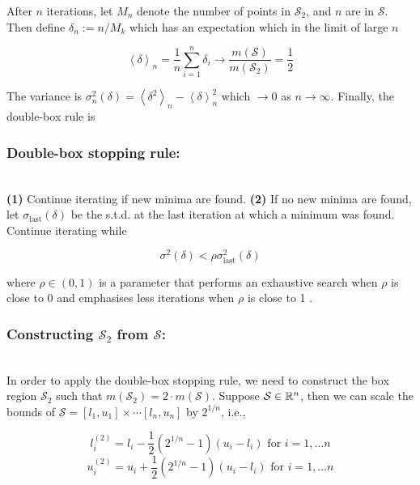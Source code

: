 After $n$ iterations, let $M_n$ denote the number of points in $\mathcal{S}_2$, and $n$ are in $\mathcal{S}$. Then define
$\delta_n := n / M_k$ which has an expectation which in the limit of large $n$

$$
\left\langle \delta \right\rangle_n = \frac{1}{n}\sum_{i=1}^n \delta_i \longrightarrow
\frac{m(\mathcal{S})}{m(\mathcal{S}_2)} = \frac{1}{2}
$$

The variance is $\sigma_n^2(\delta) = \left\langle \delta^2\right\rangle_n - \left\langle\delta\right\rangle^2_n$ which
$\longrightarrow 0$ as $n\longrightarrow \infty$. Finally, the double-box rule is

\subsubsection*{Double-box stopping rule:}

\hfill\\

\textbf{(1)} Continue iterating if new minima are found. \textbf{(2)} If no new minima are found, let $\sigma_\text{last}(\delta)$ be the s.t.d. at the last iteration
at which a minimum was found. Continue iterating while

\begin{equation}\label{eq:double-box-rule}
    \sigma^2(\delta) < \rho \sigma^2_{\text{last}}(\delta)
\end{equation}

where $\rho \in (0,1)$ is a parameter that performs an exhaustive search when $\rho$ is close to 0 and emphasises less iterations
when $\rho$ is close to 1 \cite{lagaris}.

\subsubsection*{Constructing $\mathcal{S}_2$ from $\mathcal{S}$:}

\hfill\\

In order to apply the double-box stopping rule, we need to construct the box region $\mathcal{S}_2$ such that
$m(\mathcal{S}_2) = 2\cdot m(\mathcal{S})$. Suppose $\mathcal{S} \in \mathbb{R}^n$, then we can scale the bounds of $\mathcal{S}
= [l_1, u_1] \times \cdots [l_n, u_n]$ 
by $2^{1/n}$, i.e.,

$$
l_i^{(2)} = l_i - \frac{1}{2}\left( 2^{1/n} - 1\right)\left( u_i - l_i \right)\text{ for } i = 1,\ldots n
$$
$$
u_i^{(2)} = u_i + \frac{1}{2}\left( 2^{1/n} - 1\right)\left( u_i - l_i \right)\text{ for } i = 1,\ldots n
$$


